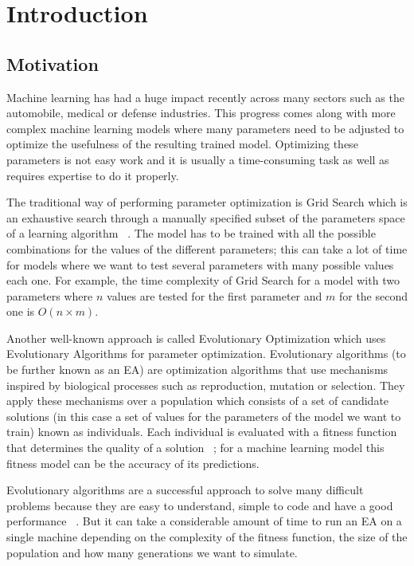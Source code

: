 \chapter{Introduction}
\section{Motivation}
Machine learning has had a huge impact recently across many sectors such as the automobile, medical or defense industries. This progress comes along with more complex machine learning models where many parameters need to be adjusted to optimize the usefulness of the resulting trained model. Optimizing these parameters is not easy work and it is usually a time-consuming task as well as requires expertise to do it properly.

The traditional way of performing parameter optimization is Grid Search which is an exhaustive search through a manually specified subset of the parameters space of a learning algorithm ~\cite{wikipedia-Hyperparameter_optimization}. The model has to be trained with all the possible combinations for the values of the different parameters; this can take a lot of time for models where we want to test several parameters with many possible values each one. For example, the time complexity of Grid Search for a model with two parameters where $n$ values are tested for the first parameter and $m$ for the second one is $O(n \times m)$.

Another well-known approach is called Evolutionary Optimization which uses Evolutionary Algorithms for parameter optimization. Evolutionary algorithms (to be further known as an EA) are optimization algorithms that use mechanisms inspired by biological processes such as reproduction, mutation or selection. They apply these mechanisms over a population which consists of a set of candidate solutions (in this case a set of values for the parameters of the model we want to train) known as individuals. Each individual is evaluated with a fitness function that determines the quality of a solution ~\cite{wikipedia-Evolutionary_Algorithm}; for a machine learning model this fitness model can be the accuracy of its predictions.

Evolutionary algorithms are a successful approach to solve many difficult problems because they are easy to understand, simple to code and have a good performance ~\cite{Intro-to-EA}. But it can take a considerable amount of time to run an EA on a single machine depending on the complexity of the fitness function, the size of the population and how many generations we want to simulate.

